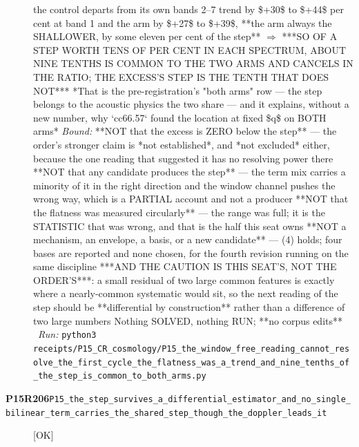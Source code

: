\begin{description}
the control departs from its own bands 2--7 trend by \$+30\$ to \$+44\$ per cent at band 1 and the arm by \$+27\$ to \$+39\$, **the arm always the SHALLOWER, by some eleven per cent of the step**  \ensuremath{\Rightarrow} ***SO OF A STEP WORTH TENS OF PER CENT IN EACH SPECTRUM, ABOUT NINE TENTHS IS COMMON TO THE TWO ARMS AND CANCELS IN THE RATIO; THE EXCESS'S STEP IS THE TENTH THAT DOES NOT***  *That is the pre-registration's "both arms" row --- the step belongs to the acoustic physics the two share --- and it explains, without a new number, why `cc66.57` found the location at fixed \$q\$ on BOTH arms*
 \emph{Bound:}  **NOT that the excess is ZERO below the step** --- the order's stronger claim is *not established*, and *not excluded* either, because the one reading that suggested it has no resolving power there  **NOT that any candidate produces the step** --- the term mix carries a minority of it in the right direction and the window channel pushes the wrong way, which is a PARTIAL account and not a producer  **NOT that the flatness was measured circularly** --- the range was full; it is the STATISTIC that was wrong, and that is the half this seat owns  **NOT a mechanism, an envelope, a basis, or a new candidate** --- (4) holds; four bases are reported and none chosen, for the fourth revision running on the same discipline  ***AND THE CAUTION IS THIS SEAT'S, NOT THE ORDER'S***: a small residual of two large common features is exactly where a nearly-common systematic would sit, so the next reading of the step should be **differential by construction** rather than a difference of two large numbers  Nothing SOLVED, nothing RUN; **no corpus edits**
\ \emph{Run:} \texttt{python3 receipts/P15\_CR\_cosmology/P15\_the\_window\_free\_reading\_cannot\_resolve\_the\_first\_cycle\_the\_flatness\_was\_a\_trend\_and\_nine\_tenths\_of\_the\_step\_is\_common\_to\_both\_arms.py}
\item[\rcptlabel{P15_the_step_survives_a_differential_estimator_and_no_single_bilinear_term_carries_the_shared_step_though_the_doppler_leads_it}{P15R206}\textbf{P15R206}\quad\texttt{P15\_the\_step\_survives\_a\_differential\_estimator\_and\_no\_single\_bilinear\_term\_carries\_the\_shared\_step\_though\_the\_doppler\_leads\_it}]\hfill\textsf{[OK]}\\

\end{description}
